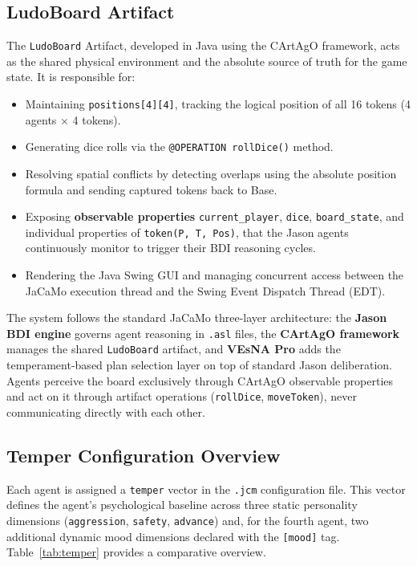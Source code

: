 \documentclass[12pt]{article}
\begin{document}
\subsection{LudoBoard Artifact}
\label{subsec:artifact}
\noindent The \texttt{LudoBoard} Artifact, developed in Java using the CArtAgO framework, acts as the shared physical environment and the absolute source of
truth for the game state. It is responsible for:
\begin{itemize}
    \item  Maintaining \texttt{positions[4][4]}, tracking the logical position of
    all 16 tokens (4 agents $\times$ 4 tokens).
    \item Generating dice rolls via the \texttt{@OPERATION rollDice()} method.
    \item Resolving spatial conflicts by detecting overlaps using the absolute
    position formula and sending captured tokens back to Base.
    \item Exposing \textbf{observable properties} \texttt{current\_player},
    \texttt{dice}, \texttt{board\_state}, and individual properties of \texttt{token(P, T, Pos)},
    that the Jason agents continuously monitor to trigger their
    BDI reasoning cycles.
    \item Rendering the Java Swing GUI and managing concurrent access between the
    JaCaMo execution thread and the Swing Event Dispatch Thread (EDT).
\end{itemize}


\noindent The system follows the standard JaCaMo three-layer architecture: the
\textbf{Jason BDI engine} governs agent reasoning in \texttt{.asl} files, the
\textbf{CArtAgO framework} manages the shared \texttt{LudoBoard} artifact, and
\textbf{VEsNA Pro} adds the temperament-based plan selection layer on top of
standard Jason deliberation. Agents perceive the board exclusively through
CArtAgO observable properties and act on it through artifact operations
(\texttt{rollDice}, \texttt{moveToken}), never communicating directly with
each other.

\subsection{Temper Configuration Overview}
\label{subsec:temper_overview}
\noindent Each agent is assigned a \texttt{temper} vector in the \texttt{.jcm}
configuration file. This vector defines the agent's psychological baseline across
three static personality dimensions (\texttt{aggression}, \texttt{safety},
\texttt{advance}) and, for the fourth agent, two additional dynamic mood
dimensions declared with the \texttt{[mood]} tag. Table~\ref{tab:temper} provides
a comparative overview.
\end{document}
